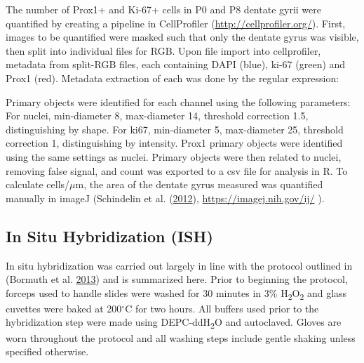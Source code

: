 \documentclass[onehalf,12pt]{beavtex}
\begin{document}
  The number of Prox1+ and Ki-67+ cells in P0 and P8 dentate gyrii were
  quantified by creating a pipeline in CellProfiler
  (\url{http://cellprofiler.org/}). First, images to be quantified were
  masked such that only the dentate gyrus was visible, then split into
  individual files for RGB. Upon file import into cellprofiler, metadata
  from split-RGB files, each containing DAPI (blue), ki-67 (green) and
  Prox1 (red). Metadata extraction of each was done by the regular
  expression:
  
  \begin{Shaded}
  \begin{Highlighting}[]
  \NormalTok{^}\KeywordTok{(}\OperatorTok{<}\OperatorTok{>}\NormalTok{[A-Z,a-z]}\KeywordTok{)}\ExtensionTok{_}\OperatorTok{<}\OperatorTok{>}\NormalTok{[a-z]}\NormalTok{)}\ExtensionTok{_}\OperatorTok{<}\OperatorTok{>}\ExtensionTok{_}\OperatorTok{<}\OperatorTok{>}
  \end{Highlighting}
  \end{Shaded}
  
  Primary objects were identified for each channel using the following
  parameters: For nuclei, min-diameter 8, max-diameter 14, threshold
  correction 1.5, distinguishing by shape. For ki67, min-diameter 5,
  max-diameter 25, threshold correction 1, distinguishing by intensity.
  Prox1 primary objects were identified using the same settings as nuclei.
  Primary objects were then related to nuclei, removing false signal, and
  count was exported to a csv file for analysis in R. To calculate
  cells/\(\mu\)m, the area of the dentate gyrus measured was quantified
  manually in imageJ (Schindelin et al.
  (\protect\hyperlink{ref-SchindelinFijiopensourceplatform2012}{2012}),
  \url{https://imagej.nih.gov/ij/} ).
  
  \subsection{In Situ Hybridization
  (ISH)}\label{in-situ-hybridization-ish}
  
  In situ hybridization was carried out largely in line with the protocol
  outlined in (Bormuth et al.
  \protect\hyperlink{ref-BormuthNeuronalBasicHelixLoopHelix2013a}{2013})
  and is summarized here. Prior to beginning the protocol, forceps used to
  handle slides were washed for 30 minutes in 3\%
  H\textsubscript{2}O\textsubscript{2} and glass cuvettes were baked at
  200\(^\circ\)C for two hours. All buffers used prior to the
  hybridization step were made using DEPC-ddH\textsubscript{2}O and
  autoclaved. Gloves are worn throughout the protocol and all washing
  steps include gentle shaking unless specified otherwise.
  
\end{document}
